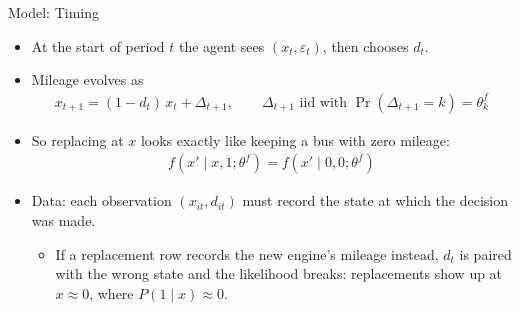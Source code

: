 \documentclass[aspectratio=169,11pt]{beamer}
\begin{document}
\begin{frame}{Model: Timing}
\begin{itemize}
\item At the start of period $t$ the agent sees $(x_t, \varepsilon_t)$, \alert{then} chooses $d_t$.
\item Mileage evolves as
\begin{align*}
x_{t+1} = (1-d_t)\, x_t + \Delta_{t+1}, \qquad \Delta_{t+1} \text{ iid with } \Pr(\Delta_{t+1} = k) = \theta^f_k
\end{align*}
\item So replacing at $x$ looks exactly like keeping a bus with zero mileage:
\begin{align*}
f(x' \mid x, 1;\theta^f) = f(x' \mid 0, 0;\theta^f)
\end{align*}
\item \alert{Data}: each observation $(x_{it}, d_{it})$ must record the state at which the decision was made.
\begin{itemize}
\item If a replacement row records the new engine's mileage instead, $d_t$ is paired with the wrong state and the likelihood breaks: replacements show up at $x \approx 0$, where $P(1 \mid x) \approx 0$.
\end{itemize}
\end{itemize}
\end{frame}

\end{document}
